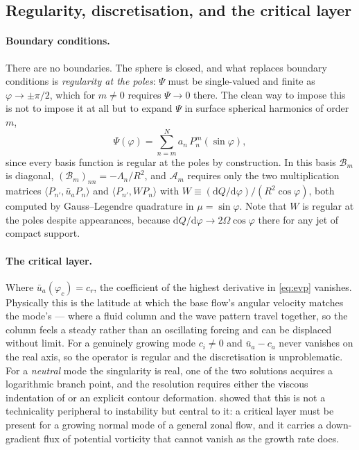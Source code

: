 \documentclass[11pt,a4paper]{article}
\newcommand{\dd}{\mathrm{d}}
\begin{document}
\subsection{Regularity, discretisation, and the critical layer}

\paragraph{Boundary conditions.} There are no boundaries. The sphere is closed,
and what replaces boundary conditions is \emph{regularity at the poles}: $\Psi$
must be single-valued and finite as $\varphi \to \pm\pi/2$, which for $m \neq 0$
requires $\Psi \to 0$ there. The clean way to impose this is not to impose it at
all but to expand $\Psi$ in surface spherical harmonics of order $m$,
%
\begin{equation}
\Psi(\varphi) = \sum_{n=m}^{N} a_n\,P_n^m(\sin\varphi) ,
\label{eq:expansion}
\end{equation}
%
since every basis function is regular at the poles by construction. In this
basis $\mathcal{B}_m$ is diagonal, $(\mathcal{B}_m)_{nn} = -\Lambda_n/R^2$, and
$\mathcal{A}_m$ requires only the two multiplication matrices
$\langle P_{n'}, \bar u_a P_n\rangle$ and
$\langle P_{n'}, W P_n\rangle$ with
$W \equiv (\dd Q/\dd\varphi)/(R^2\cos\varphi)$, both computed by Gauss--Legendre
quadrature in $\mu = \sin\varphi$. Note that $W$ is regular at the poles despite
appearances, because $\dd Q/\dd\varphi \to 2\Omega\cos\varphi$ there for any jet
of compact support.

\paragraph{The critical layer.} Where $\bar u_a(\varphi_c) = c_r$, the
coefficient of the highest derivative in \eqref{eq:evp} vanishes. Physically
this is the latitude at which the base flow's angular velocity matches the
mode's --- where a fluid column and the wave pattern travel together, so the
column feels a steady rather than an oscillating forcing and can be displaced
without limit. For a genuinely growing mode $c_i \neq 0$ and
$\bar u_a - c_a$ never vanishes on the real axis, so the operator is regular and
the discretisation is unproblematic. For a \emph{neutral} mode the singularity is
real, one of the two solutions acquires a logarithmic branch point, and the
resolution requires either the viscous indentation of \citet{kuo1949} or an
explicit contour deformation. \citet{bretherton1966} showed that this is not a
technicality peripheral to instability but central to it: a critical layer must
be present for a growing normal mode of a general zonal flow, and it carries a
down-gradient flux of potential vorticity that cannot vanish as the growth rate
does.
\end{document}
